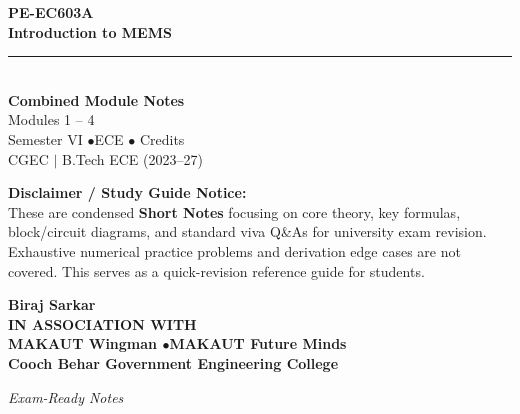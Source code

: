 \documentclass[12pt,a4paper]{article}
\begin{document}
\thispagestyle{empty}


\vspace*{1.0cm}
\begin{center}
  {\Huge\bfseries\color{myred} PE-EC603A}\\[10pt]
  {\LARGE\bfseries\color{mydark} Introduction to MEMS}\\[20pt]
  {\color{myred}\rule{0.7\linewidth}{1.5pt}}\\[18pt]
  {\Large\color{myteal}\textbf{Combined Module Notes}}\\[8pt]
  {\large\color{mydark} Modules 1 -- 4}\\[40pt]
  {\normalsize\color{mydark} Semester VI \quad$\bullet$\quad ECE \quad$\bullet$ Credits}\\[12pt]
  {\normalsize\color{mydark} CGEC \;$|$\; B.Tech ECE (2023--27)}
\end{center}
\vspace{1.0cm}
\begin{center}
  \begin{tcolorbox}[colback=mygray, colframe=mgframe, boxrule=0.5pt, arc=3pt, width=0.85\linewidth]
    \centering\small\color{mydark}
    \textbf{Disclaimer / Study Guide Notice:}\\
    These are condensed \textbf{Short Notes} focusing on core theory, key formulas, block/circuit diagrams, and standard viva Q\&As for university exam revision. Exhaustive numerical practice problems and derivation edge cases are not covered. This serves as a quick-revision reference guide for students.
  \end{tcolorbox}
\end{center}
\vfill
\vspace{0.6cm}
\begin{center}
  {\large\bfseries\color{mypurple} Biraj Sarkar}\\[16pt]
  {\footnotesize\color{watermark}\textbf{IN ASSOCIATION WITH}}\\[8pt]
  {\small\bfseries\color{mydark} MAKAUT Wingman \quad$\bullet$\quad MAKAUT Future Minds}\\[12pt]
  {\large\bfseries\color{myteal} Cooch Behar Government Engineering College}
\end{center}
\vfill
\begin{center}{\small\color{watermark}\textit{Exam-Ready Notes}}\end{center}
\clearpage
\end{document}
